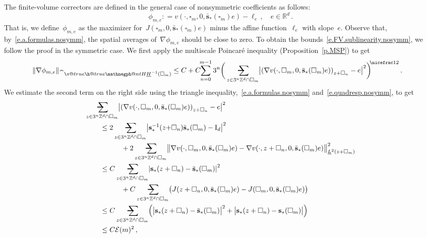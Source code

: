 \documentclass[11pt,twoside]{article} %
\makeatletter
\let\oldsquare\square %
\renewcommand{\square}{\oldsquare}
\numberwithin{equation}{section}
\theoremstyle{definition}
\let\originalleft\left
\let\originalright\right
\renewcommand{\left}{\mathopen{}\mathclose\bgroup\originalleft}
\renewcommand{\right}{\aftergroup\egroup\originalright}
\newcommand*{\Id}{\ensuremath{\mathrm{I}_d}}
\newcommand*{\Zd}{\ensuremath{\mathbb{Z}^d}}
\newcommand*{\Rd}{\ensuremath{\mathbb{R}^d}}
\renewcommand*{\hat}{\widehat}
\newcommand{\s}{\mathbf{s}}
\renewcommand{\k}{\mathbf{k}}
\newcommand{\shom}{\bar{\mathbf{s}}}
\newcommand{\cu}{\square}
\newcommand{\avsum}{\mathop{\mathpalette\avsuminner\relax}\displaylimits}
\newcommand\avsuminner[2]{%
  {\sbox0{$\m@th#1\sum$}%
   \vphantom{\usebox0}%
   \ooalign{%
     \hidewidth
     \smash{\,\rule[.23em]{8.8pt}{1.1pt} \relax}%
     \hidewidth\cr
   ~$\m@th#1\sum$\cr
   }%
  }%
}
\newcommand{\negphantom}{\v@true\h@true\negph@nt}
\newcommand{\negph@nt}{\ifmmode\expandafter\mathpalette 
  \expandafter\mathnegph@nt\else\expandafter\makenegph@nt\fi}
\newcommand{\makenegph@nt}[1]{%
  \setbox\z@\hbox{\color@begingroup#1\color@endgroup}\finnegph@nt}
\newcommand{\finnegph@nt}{%
  \setbox\tw@\null 
  \ifv@ \ht\tw@\ht\z@\dp\tw@\dp\z@\fi \ifh@\wd\tw@-\wd\z@\fi\box\tw@}
\newcommand{\mathnegph@nt}[2]{%
  \setbox\z@\hbox{$\m@th #1{#2}$}\finnegph@nt}
\newcommand{\Hminusul}{\hat{\phantom{H}}\negphantom{H}\underline{H}^{-1}}
\makeatother
\begin{document}
The finite-volume correctors are defined in the general case of nonsymmetric coefficients as follows:
\begin{equation}
\label{e.FVCtomu}
\phi_{m,e}: = v(\cdot,\cu_m,0,\shom_*(\cu_m) e) - \ell_e
\,, \quad e\in \Rd\,.
\end{equation}
That is, we define~$\phi_{m,e}$ as the maximizer for~$J(\cu_m,0,\shom_*(\cu_m) e)$ minus the affine function~$\ell_e$ with slope~$e$. Observe that, by~\eqref{e.a.formulas.nosymm}, the spatial averages of~$\nabla \phi_{m,e}$ should be close to zero. 
To obtain the bounds~\eqref{e.FV.sublinearity.nosymm}, we follow the proof in the symmetric case. We first apply the multiscale Poincar\'e inequality (Proposition~\ref{p.MSP}) to get
\begin{align}
\label{e.phime.grad.decomp}
\| \nabla \phi_{m,e} \|_{\Hminusul(\cu_m)} 
&
\leq
C
+
C\!\!
\sum_{n=0}^{{m-1}} 3^{n} 
\biggl( \, \avsum_{z\in 3^n\Zd\cap \cu_{m}} 
\left| \left( \nabla v(\cdot,\cu_m,0,\shom_*(\cu_m) e)  \right)_{z+\cu_n} - e \right|^2 \biggr)^{\!\!\nicefrac12}
\,.
\end{align}
We estimate the second term on the right side using the triangle inequality,~\eqref{e.a.formulas.nosymm} and~\eqref{e.quadresp.nosymm}, to get 
\begin{align}
\lefteqn{
\avsum_{z\in 3^n\Zd\cap \cu_{m}} 
\left| \left( \nabla v(\cdot,\cu_m,0,\shom_*(\cu_m) e)  \right)_{z+\cu_n} - e \right|^2
} 
\qquad & 
\notag \\ & 
\leq
2 \avsum_{z\in 3^n\Zd\cap \cu_{m}} 
\bigl| 
\s_*^{-1} (z{+}\cu_n) \shom_*(\cu_m) - \Id
\bigr|^2
\notag \\ & \qquad \quad 
+
2\avsum_{z\in 3^n\Zd\cap \cu_{m}} 
\bigl\| 
\nabla v(\cdot,\cu_m,0,\shom_*(\cu_m) e) - \nabla v(\cdot,z+\cu_n,0,\shom_*(\cu_m) e)
\bigr\|_{\underline{L}^2(z{+}\cu_m)}^2
\notag \\ & 
\leq
C\avsum_{z\in 3^n\Zd\cap \cu_{m}} 
\left| 
\s_*(z+\cu_n) - \shom_*(\cu_m) \right|^2
\notag \\ & \qquad \quad 
+
C\avsum_{z\in 3^n\Zd\cap \cu_{m}} 
\bigl( 
J(z+\cu_n,0,\shom_*(\cu_m) e) - J(\cu_m,0,\shom_*(\cu_m) e) \bigr)
\label{}
\notag \\ & 
\leq 
C\avsum_{z\in 3^n\Zd\cap \cu_{m}} 
\Bigl( 
\bigl| 
\s_*(z+\cu_n) - \shom_*(\cu_m) \bigr|^2
+
\bigl| \s_*(z+\cu_n) - \s_*(\cu_m) \bigr| 
\Bigr)
\label{e.triangledown.nosymm.betterer}
\\ & 
\leq 
C\mathcal{E}(m)^2 \,,
\label{e.triangledown.nosymm}
\end{align}
\end{document}
